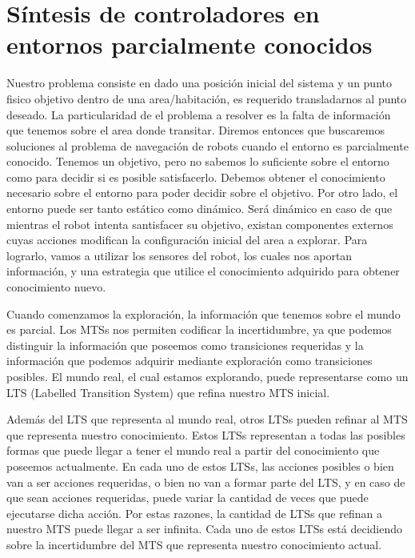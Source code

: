 \chapter{Síntesis de controladores en entornos parcialmente conocidos}

Nuestro problema consiste en dado una posición inicial del sistema y un punto 
fisico objetivo dentro de una area/habitación, es requerido transladarnos al 
punto deseado. La particularidad de el problema a resolver es la falta de 
información que tenemos sobre el area donde transitar. Diremos entonces que 
buscaremos soluciones al problema de navegación de robots cuando el entorno es 
parcialmente conocido.
Tenemos un objetivo, pero no sabemos lo suficiente sobre el entorno como para 
decidir si es 
posible satisfacerlo. Debemos obtener el conocimiento necesario sobre el 
entorno para poder decidir sobre el objetivo. 
Por otro lado, el entorno puede ser tanto estático como dinámico. Será dinámico 
en caso de que mientras el robot intenta santisfacer su objetivo, existan 
componentes externos cuyas acciones modifican la configuración inicial del area 
a explorar.
Para lograrlo, vamos a utilizar los sensores del robot, los cuales nos aportan 
información, y una estrategia que 
utilice el conocimiento adquirido para obtener conocimiento nuevo.


Cuando comenzamos la exploración, la información que tenemos sobre el mundo es 
parcial. Los MTSs nos permiten codificar
la incertidumbre, ya que podemos distinguir la información que poseemos como 
transiciones requeridas y la información
que podemos adquirir mediante exploración como transiciones posibles. El mundo 
real, el cual estamos explorando, puede 
representarse como un LTS (Labelled Transition System) que refina nuestro MTS 
inicial.

Además del LTS que representa al mundo real, otros LTSs pueden refinar al MTS 
que representa nuestro conocimiento. Estos
LTSs representan a todas las posibles formas que puede llegar a tener el mundo 
real a partir del conocimiento que poseemos
actualmente. En cada uno de estos LTSs, las acciones posibles o bien van a ser 
acciones requeridas, o bien no van a formar
parte del LTS, y en caso de que sean acciones requeridas, puede variar la 
cantidad de veces que puede ejecutarse dicha acción.
Por estas razones, la cantidad de LTSs que refinan a nuestro MTS puede llegar a 
ser infinita. Cada uno de estos LTSs está
decidiendo sobre la incertidumbre del MTS que representa nuestro conocimiento 
actual.


